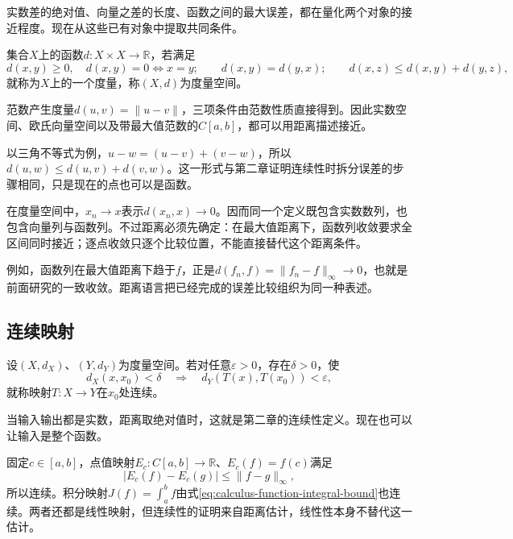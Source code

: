 实数差的绝对值、向量之差的长度、函数之间的最大误差，都在量化两个对象的接近程度。现在从这些已有对象中提取共同条件。

\begin{definition}
集合\(X\)上的函数\(d:X\times X\to\mathbb R\)，若满足
\begin{equation*}
 d(x,y)\ge0,\quad d(x,y)=0\Longleftrightarrow x=y;\qquad
 d(x,y)=d(y,x);\qquad
 d(x,z)\le d(x,y)+d(y,z),
\end{equation*}
就称为\(X\)上的一个{\heiti{}度量}，称\((X,d)\)为{\heiti{}度量空间}。
\end{definition}

范数产生度量\(d(u,v)=\|u-v\|\)，三项条件由范数性质直接得到。因此实数空间、欧氏向量空间以及带最大值范数的\(C[a,b]\)，都可以用距离描述接近。

以三角不等式为例，\(u-w=(u-v)+(v-w)\)，所以\(d(u,w)\le d(u,v)+d(v,w)\)。这一形式与第二章证明连续性时拆分误差的步骤相同，只是现在的点也可以是函数。

在度量空间中，\(x_n\to x\)表示\(d(x_n,x)\to0\)。因而同一个定义既包含实数数列，也包含向量列与函数列。不过距离必须先确定：在最大值距离下，函数列收敛要求全区间同时接近；逐点收敛只逐个比较位置，不能直接替代这个距离条件。

例如，函数列在最大值距离下趋于\(f\)，正是\(d(f_n,f)=\|f_n-f\|_\infty\to0\)，也就是前面研究的一致收敛。距离语言把已经完成的误差比较组织为同一种表述。

\subsection{连续映射}

\begin{definition}
设\((X,d_X)\)、\((Y,d_Y)\)为度量空间。若对任意\(\varepsilon>0\)，存在\(\delta>0\)，使
\begin{equation*}
 d_X(x,x_0)<\delta\quad\Longrightarrow\quad
 d_Y(T(x),T(x_0))<\varepsilon,
\end{equation*}
就称映射\(T:X\to Y\)在\(x_0\)处{\heiti{}连续}。
\end{definition}

当输入输出都是实数，距离取绝对值时，这就是第二章的连续性定义。现在也可以让输入是整个函数。

固定\(c\in[a,b]\)，点值映射\(E_c:C[a,b]\to\mathbb R\)、\(E_c(f)=f(c)\)满足
\begin{equation*}
 |E_c(f)-E_c(g)|\le\|f-g\|_\infty,
\end{equation*}
所以连续。积分映射\(J(f)=\int_a^bf\)由式\eqref{eq:calculus-function-integral-bound}也连续。两者还都是线性映射，但连续性的证明来自距离估计，线性性本身不替代这一估计。

